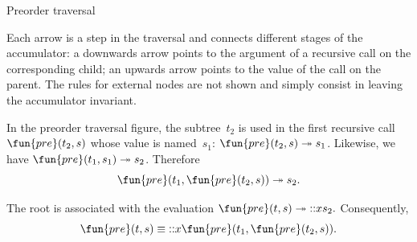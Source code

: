 %
\begin{frame}{Preorder traversal}

  Each arrow is a step in the traversal and connects different stages
  of the accumulator: a downwards arrow points to the argument of a
  recursive call on the corresponding child; an upwards arrow points
  to the value of the call on the parent. The rules for external
  nodes are not shown and simply consist in leaving the accumulator
  invariant.

  \bigskip

  In the preorder traversal figure, the subtree~\(t_2\) is used in the
  first recursive call \(\fun{pre}(t_2, s)\) whose value is
  named~\(s_1\): \(\fun{pre}(t_2, s) \twoheadrightarrow s_1\).
  Likewise, we have \(\fun{pre}(t_1, s_1) \twoheadrightarrow
  s_2\). Therefore
  \begin{equation*}
    \fun{pre}(t_1, \fun{pre}(t_2, s)) \twoheadrightarrow s_2.
  \end{equation*}

  The root is associated with the evaluation
  $\fun{pre}(t, s) \twoheadrightarrow \cons{x}{s_2}.$
  Consequently,
  \begin{equation*}
    \fun{pre}(t, s) \equiv \cons{x}{\fun{pre}(t_1, \fun{pre}(t_2, s))}.
  \end{equation*}

\end{frame}

